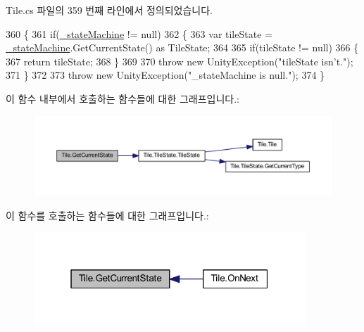 Tile.\+cs 파일의 359 번째 라인에서 정의되었습니다.


\begin{DoxyCode}
360     \{
361         \textcolor{keywordflow}{if}(\hyperlink{class_tile_a822a1bffe56b1193b8c5c61070ea7827}{\_stateMachine} != null)
362         \{
363             var tileState = \hyperlink{class_tile_a822a1bffe56b1193b8c5c61070ea7827}{\_stateMachine}.GetCurrentState() as TileState;
364 
365             \textcolor{keywordflow}{if}(tileState != null)
366             \{
367                 \textcolor{keywordflow}{return} tileState;
368             \}
369 
370             \textcolor{keywordflow}{throw} \textcolor{keyword}{new} UnityException(\textcolor{stringliteral}{"tileState isn't."});
371         \}
372 
373         \textcolor{keywordflow}{throw} \textcolor{keyword}{new} UnityException(\textcolor{stringliteral}{"\_stateMachine is null."});
374     \}
\end{DoxyCode}


이 함수 내부에서 호출하는 함수들에 대한 그래프입니다.\+:\nopagebreak
\begin{figure}[H]
\begin{center}
\leavevmode
\includegraphics[width=350pt]{class_tile_ae37e08e39263e766fdc612de94fb7a0d_cgraph}
\end{center}
\end{figure}




이 함수를 호출하는 함수들에 대한 그래프입니다.\+:\nopagebreak
\begin{figure}[H]
\begin{center}
\leavevmode
\includegraphics[width=289pt]{class_tile_ae37e08e39263e766fdc612de94fb7a0d_icgraph}
\end{center}
\end{figure}


